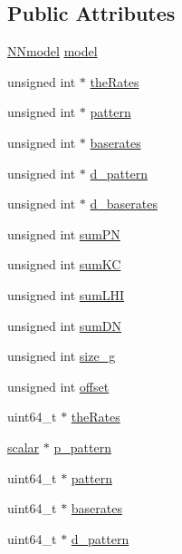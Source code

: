 \subsection*{Public Attributes}
\begin{DoxyCompactItemize}
\item 
\hyperlink{classNNmodel}{N\+Nmodel} \hyperlink{classclassol_a9bc46b83d0158325cfdd8721936541d5}{model}
\item 
unsigned int $\ast$ \hyperlink{classclassol_ac0966348c8b0301162dfd20abe15720e}{the\+Rates}
\item 
unsigned int $\ast$ \hyperlink{classclassol_a808754f723275a8e8e76f456b63eaea3}{pattern}
\item 
unsigned int $\ast$ \hyperlink{classclassol_a7aa9c750f4ce5925003cb6b9cd215f8e}{baserates}
\item 
unsigned int $\ast$ \hyperlink{classclassol_a99dd2f7af0454b904234df4ac3400445}{d\+\_\+pattern}
\item 
unsigned int $\ast$ \hyperlink{classclassol_a0453758295a0bcabf7ae00949a51e717}{d\+\_\+baserates}
\item 
unsigned int \hyperlink{classclassol_abd188bdb202d67ec2c1a6316128f9c44}{sum\+P\+N}
\item 
unsigned int \hyperlink{classclassol_ad04f16a78fce1de429fc9371380fb15a}{sum\+K\+C}
\item 
unsigned int \hyperlink{classclassol_a9157c62195074a9bc34c5570e311315c}{sum\+L\+H\+I}
\item 
unsigned int \hyperlink{classclassol_ae8a843f0151b506bd3548c33c9d78c7c}{sum\+D\+N}
\item 
unsigned int \hyperlink{classclassol_aa6efbc353061391575387b33639d7961}{size\+\_\+g}
\item 
unsigned int \hyperlink{classclassol_a4c91e54037a58e0b286f10a986d46d9c}{offset}
\item 
uint64\+\_\+t $\ast$ \hyperlink{classclassol_a0b534a0ff6a56ab9e137f964bcf29d78}{the\+Rates}
\item 
\hyperlink{sizes_8h_afad04d16ebd8523dd0d5f74145280a40}{scalar} $\ast$ \hyperlink{classclassol_a39baf7a24fd68df1ba55b6f6dc5e3fd7}{p\+\_\+pattern}
\item 
uint64\+\_\+t $\ast$ \hyperlink{classclassol_a16f82061914e21c2724df0c0044f58dc}{pattern}
\item 
uint64\+\_\+t $\ast$ \hyperlink{classclassol_afc6650247da3c85e829264ccb5c4f569}{baserates}
\item 
uint64\+\_\+t $\ast$ \hyperlink{classclassol_ab864befa4f0f4b067b78933dbfd77ced}{d\+\_\+pattern}

\end{DoxyCompactItemize}
